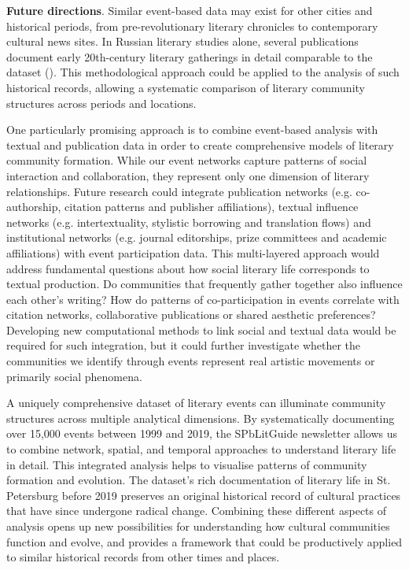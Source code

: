 \documentclass{jcls}
\begin{document}
\textbf{Future directions}. Similar event-based data may exist for other cities and historical periods, from pre-revolutionary literary chronicles to contemporary cultural news sites. In Russian literary studies alone, several publications document early 20th-century literary gatherings in detail comparable to the dataset (\cite{galushkin, lavrov2002, lavrov2017}). This methodological approach could be applied to the analysis of such historical records, allowing a systematic comparison of literary community structures across periods and locations.

One particularly promising approach is to combine event-based analysis with textual and publication data in order to create comprehensive models of literary community formation. While our event networks capture patterns of social interaction and collaboration, they represent only one dimension of literary relationships. Future research could integrate publication networks (e.g. co-authorship, citation patterns and publisher affiliations), textual influence networks (e.g. intertextuality, stylistic borrowing and translation flows) and institutional networks (e.g. journal editorships, prize committees and academic affiliations) with event participation data. This multi-layered approach would address fundamental questions about how social literary life corresponds to textual production. Do communities that frequently gather together also influence each other's writing? How do patterns of co-participation in events correlate with citation networks, collaborative publications or shared aesthetic preferences? Developing new computational methods to link social and textual data would be required for such integration, but it could further investigate whether the communities we identify through events represent real artistic movements or primarily social phenomena.

A uniquely comprehensive dataset of literary events can illuminate community structures across multiple analytical dimensions. By systematically documenting over 15,000 events between 1999 and 2019, the SPbLitGuide newsletter allows us to combine network, spatial, and temporal approaches to understand literary life in detail. This integrated analysis helps to visualise patterns of community formation and evolution. The dataset's rich documentation of literary life in St. Petersburg before 2019 preserves an original historical record of cultural practices that have since undergone radical change. Combining these different aspects of analysis opens up new possibilities for understanding how cultural communities function and evolve, and provides a framework that could be productively applied to similar historical records from other times and places.

%
%
%
\end{document}

